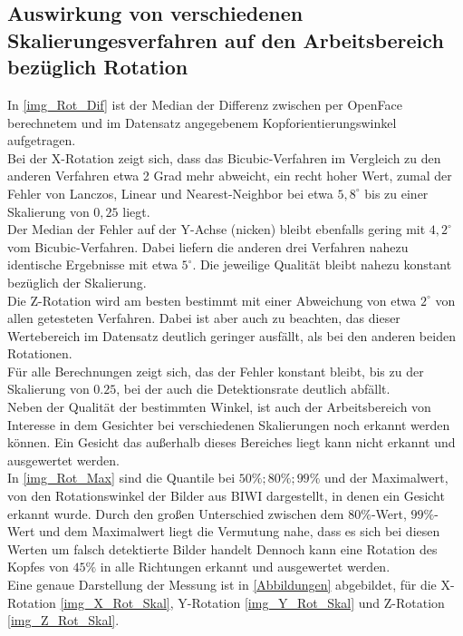 \subsection{Auswirkung von verschiedenen Skalierungesverfahren auf den Arbeitsbereich bezüglich Rotation}
In \autoref{img_Rot_Dif} ist der Median der Differenz zwischen per OpenFace berechnetem und im Datensatz angegebenem Kopforientierungswinkel aufgetragen.\\
Bei der X-Rotation zeigt sich, dass das Bicubic-Verfahren im Vergleich zu den anderen Verfahren etwa 2 Grad mehr abweicht, ein recht hoher Wert, zumal der Fehler von Lanczos, Linear und Nearest-Neighbor bei etwa $5,8^\circ$ bis zu einer Skalierung von $0,25$ liegt.\\
Der Median der Fehler auf der Y-Achse (nicken) bleibt ebenfalls gering mit $4,2^\circ$ vom Bicubic-Verfahren. Dabei liefern die anderen drei Verfahren nahezu identische Ergebnisse mit etwa $5^\circ$. Die jeweilige Qualität bleibt nahezu konstant bezüglich der Skalierung.\\
Die Z-Rotation wird am besten bestimmt mit einer Abweichung von etwa $2^\circ$ von allen getesteten Verfahren. Dabei ist aber auch zu beachten, das dieser Wertebereich im Datensatz deutlich geringer ausfällt, als bei den anderen beiden Rotationen.\\
Für alle Berechnungen zeigt sich, das der Fehler konstant bleibt, bis zu der Skalierung von $0.25$, bei der auch die Detektionsrate deutlich abfällt.\\
Neben der Qualität der bestimmten Winkel, ist auch der Arbeitsbereich von Interesse in dem Gesichter bei verschiedenen Skalierungen noch erkannt werden können. Ein Gesicht das außerhalb dieses Bereiches liegt kann nicht erkannt und ausgewertet werden.\\
In \autoref{img_Rot_Max} sind die Quantile bei $50\%; 80\%; 99\%$ und der Maximalwert, von den Rotationswinkel der Bilder aus BIWI \cite{database_Face_Ori} dargestellt, in denen ein Gesicht erkannt wurde. Durch den großen Unterschied zwischen dem $80\%$-Wert, $99\%$-Wert und dem Maximalwert liegt die Vermutung nahe, dass es sich bei diesen Werten um falsch detektierte Bilder handelt Dennoch kann eine Rotation des Kopfes von $45\%$ in alle Richtungen erkannt und ausgewertet werden.\\
Eine genaue Darstellung der Messung ist in \autoref{Abbildungen} abgebildet, für die X-Rotation \autoref{img_X_Rot_Skal}, Y-Rotation \autoref{img_Y_Rot_Skal} und Z-Rotation \autoref{img_Z_Rot_Skal}.
